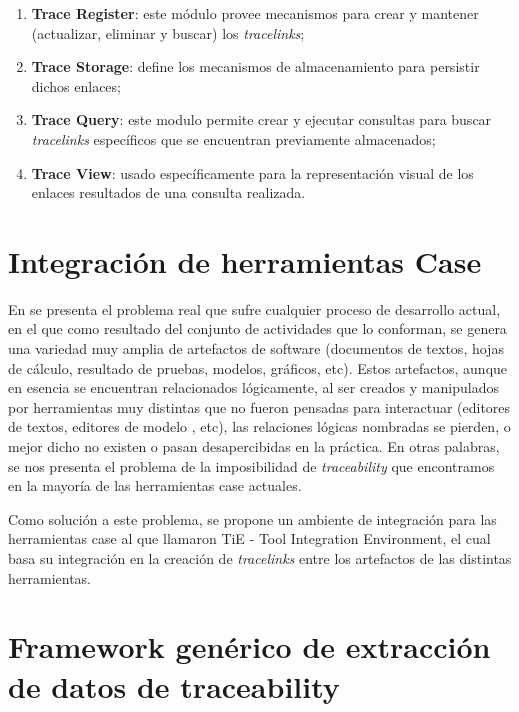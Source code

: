 \documentclass[a4paper,12pt,oneside,spanish]{book}
\begin{document}
\begin{enumerate}
\item \textbf{Trace Register}: este módulo provee mecanismos para crear y mantener (actualizar, eliminar y buscar) los \textit{tracelinks};
\item \textbf{Trace Storage}: define los mecanismos de almacenamiento para persistir dichos enlaces;
\item \textbf{Trace Query}: este modulo permite crear y ejecutar consultas para buscar \textit{tracelinks} específicos que se encuentran previamente almacenados;
\item \textbf{Trace View}: usado específicamente para la representación visual de los enlaces resultados de una consulta realizada.
\end{enumerate}


\section{Integración de herramientas Case}

En \cite{KlarRoseSchurr} se presenta el problema real que sufre cualquier proceso de desarrollo actual, en el que como resultado del conjunto de actividades que lo conforman, se genera una variedad muy amplia de artefactos de software (documentos de textos, hojas de cálculo, resultado de pruebas, modelos, gráficos, etc). Estos artefactos, aunque en esencia se encuentran relacionados lógicamente, al ser creados y manipulados por herramientas muy distintas que no fueron pensadas para interactuar (editores de textos, editores de modelo , etc), las relaciones lógicas nombradas se pierden, o mejor dicho no existen o pasan desapercibidas en la práctica. En otras palabras, se nos presenta el problema de la imposibilidad de \textit{traceability} que encontramos en la mayoría de las herramientas \gls{case} actuales.

Como solución a este problema, se propone un ambiente de integración para las herramientas \gls{case} al que llamaron \textsf{TiE} - Tool Integration Environment, el cual basa su integración en la creación de \textit{tracelinks} entre los artefactos de las distintas herramientas.

\section{Framework genérico de extracción de datos de traceability}
\label{sec:Trace-DSL}
\end{document}

